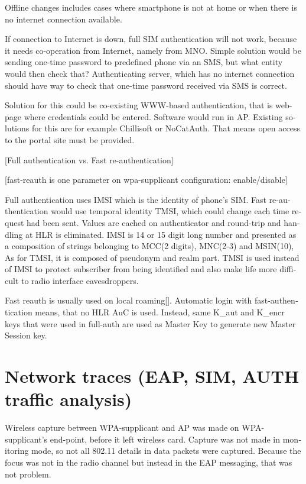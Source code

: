\documentclass[12pt,a4paper,english]{tutthesis}
\begin{document}
\begin{otherlanguage}{english}
Offline changes includes cases where smartphone is not at home or when
there is no internet connection available.





If connection to Internet is down, full SIM authentication will not
work, because it needs co-operation from Internet, namely from MNO.
Simple solution would be sending one-time password to predefined
phone via an SMS, but what entity would then check that?
Authenticating server, which has no internet connection should 
have way to check that one-time password received via SMS is correct.

Solution for this could be co-existing WWW-based authentication, that
is web-page where credentials could be entered.
Software would run in AP. Existing solutions for this are for example
Chillisoft or NoCatAuth. That means open access to the
portal site must be provided.

[Full authentication vs. Fast re-authentication]

[fast-reauth is one parameter on wpa-supplicant configuration: enable/disable]



Full authentication uses IMSI which is the identity of phone's SIM.
Fast re-authentication would use temporal identity TMSI, which 
could change each time request had been sent. Values
are cached on authenticator and round-trip and handling at HLR is
eliminated. 
IMSI is 14 or 15 digit long number and presented as a composition
of strings belonging to MCC(2 digits), MNC(2-3) and MSIN(10),
As for TMSI, it is composed of pseudonym and realm part.
TMSI is used instead of IMSI to protect subscriber from being
identified and also make life more difficult to radio interface
eavesdroppers\cite{imsi-tmsi}.

Fast reauth is usually used on
local roaming[\cite{xxx}].
Automatic login with fast-authentication means, that no HLR AuC
is used. Instead, same K\_aut and K\_encr keys  that were used in full-auth are used  as Master Key to generate new Master Session key.\cite[30]{rfc4186}


\section{Network traces (EAP, SIM, AUTH traffic analysis)}
\label{sec-5-4}
Wireless capture between WPA-supplicant and AP was made on
WPA-supplicant's end-point, before it left wireless card. Capture was
not made in monitoring mode, so not all 802.11 details in
data packets were captured.  Because the focus was not in the
radio channel but instead in the EAP messaging, that was not problem.
\cite{wireshark-capture}


\end{otherlanguage}
\end{document}
